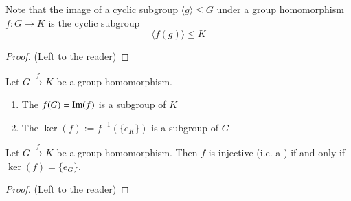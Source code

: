 \begin{remark}
        Note that the image of a cyclic subgroup $\langle g \rangle \leq G$ under a group homomorphism $f: G \rightarrow K$ is the cyclic subgroup \begin{equation}
                \langle f(g) \rangle \leq K
        \end{equation}
\end{remark}
\begin{proof}
        (Left to the reader)
\end{proof}

\begin{corollary}
        Let $G \xrightarrow{f} K$ be a group homomorphism. \begin{enumerate}
                \item The  $f(G) = \operatorname{Im}(f)$ is a subgroup of $K$
                \item The  $\ker(f) := f^{-1}(\{e_K\})$ is a subgroup of $G$
        \end{enumerate}
\end{corollary}

\begin{proposition}
        Let $G\xrightarrow{f} K$ be a group homomorphism. Then $f$ is injective (i.e. a ) if and only if $\ker(f) = \{e_G\}$.
\end{proposition}
\begin{proof}
        (Left to the reader)
\end{proof}


